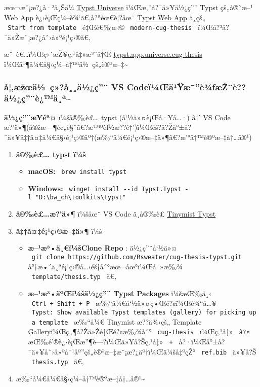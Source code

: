 æœ¬æ¨¡æ?¿å·²ä¸Šä¼ \href{https://typst.app/universe}{Typst Universe}
ï¼Œæ‚¨å?¯ä»¥ä½¿ç''¨ Typst çš„å®˜æ--¹ Web App
è¿›è¡Œç¼--è¾`ã€‚å?ªéœ€è¦?åœ¨ \href{https://typst.app/}{Typst Web App}
ä¸­çš„ \texttt{\ Start\ from\ template\ } é‡Œé€‰æ‹©
\texttt{\ modern-cug-thesis\ } ï¼Œå?³å?¯ä»Žæ¨¡æ?¿åˆ›å»ºé¡¹ç›®ã€‚

æˆ--è€\ldots ï¼Œç›´æŽ¥ç‚¹å‡»æ³¨å†Œ
\href{https://typst.app/app?template=modern-cug-thesis&version=0.1.0}{typst.app.universe.cug-thesis}
ï¼Œå¹¶å¼€å§‹ç¼--å†™ä½~çš„è®ºæ--‡\textasciitilde{}

\subsubsection{å¦‚æžœä½~ç»?å¸¸ä½¿ç''¨ VS
Codeï¼Œä¹Ÿæ¯''è¾ƒæŽ¨è??ä½¿ç''¨è¿™ä¸ª\textasciitilde{}}\label{uxe5uxe6ux17eux153uxe4uxbd-uxe7uxe5uxe4uxbduxe7-vs-codeuxefuxbcux153uxe4uxb9uxffuxe6uxe8uxbeux192uxe6ux17euxe8uxe4uxbduxe7uxe8uxe4uxaa}

\textbf{ä½¿ç''¨æ­¥éª¤} ï¼šå®‰è£\ldots{} typst (å`½ä»¤è¡Œå·¥å\ldots·) â†'
VS Code
æ?'ä»¶(å®žæ---¶é¢„è§ˆã€?æ™ºèƒ½æ??é†')ï¼Œéš?å?Žå°±å?¯ä»¥å‡†å¤‡å¼€å§‹é¡¹ç›®äº†(æ‰``å¼€é¡¹ç›®æ--‡ä»¶ã€?æ'°å†™è®ºæ--‡å†\ldots å®¹)

\begin{enumerate}
\item
  \textbf{å®‰è£\ldots{} typst ï¼š}

  \begin{itemize}
  \tightlist
  \item
    \textbf{macOS:} \texttt{\ brew\ install\ typst\ }
  \item
    \textbf{Windows:}
    \texttt{\ winget\ install\ -\/-id\ Typst.Typst\ -l\ "D:\textbackslash{}bw\_ch\textbackslash{}toolkits\textbackslash{}typst"\ }
  \end{itemize}
\item
  \textbf{å®‰è£\ldots æ?'ä»¶} ï¼šåœ¨ VS Code ä¸­å®‰è£
  \href{https://marketplace.visualstudio.com/items?itemName=myriad-dreamin.tinymist}{Tinymist
  Typst}
\item
  \textbf{å‡†å¤‡é¡¹ç›®æ--‡ä»¶} ï¼š

  \begin{itemize}
  \tightlist
  \item
    \textbf{æ--¹æ³•ä¸€ï¼šClone Repo} : ä½¿ç''¨å`½ä»¤
    \texttt{\ git\ clone\ https://github.com/Rsweater/cug-thesis-typst.git\ }
    å°†æ•´ä¸ªé¡¹ç›®å\ldots‹éš†åˆ°æœ¬åœ°ï¼Œå¯»æ‰¾
    \texttt{\ template/thesis.typ\ } ã€‚
  \item
    \textbf{æ--¹æ³•äºŒï¼šä½¿ç''¨ Typst Packages} ï¼šæŒ‰ä¸‹
    \texttt{\ Ctrl\ +\ Shift\ +\ P\ } æ‰``å¼€å`½ä»¤ç•Œé?¢ï¼Œè¾``å\ldots¥
    \texttt{\ Typst:\ Show\ available\ Typst\ templates\ (gallery)\ for\ picking\ up\ a\ template\ }
    æ‰``å¼€ Tinymist æ??ä¾›çš„ Template Galleryï¼Œç„¶å?Žä»Žé‡Œé?¢æ‰¾åˆ°
    \texttt{\ cug-thesis\ } ï¼Œç‚¹å‡» \texttt{\ â?¤\ }
    æŒ‰é'®è¿›è¡Œæ''¶è---?ï¼Œä»¥å?Šç‚¹å‡» \texttt{\ +\ }
    å?·ï¼Œå°±å?¯ä»¥åˆ›å»ºå¯¹åº''çš„è®ºæ--‡æ¨¡æ?¿äº†ï¼Œä¼šå‡ºçŽ°
    \texttt{\ ref.bib\ } ä»¥å?Š \texttt{\ thesis.typ\ } ã€‚
  \end{itemize}
\item
  æ‰``å¼€å¼€å§‹ç¼--å†™è®ºæ--‡å†\ldots å®¹\textasciitilde{}
\end{enumerate}


